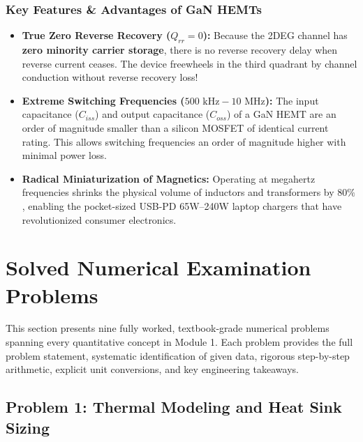 \documentclass[11pt,a4paper]{article}
\begin{document}
\subsubsection{Key Features \& Advantages of GaN HEMTs}
\begin{itemize}[leftmargin=*]
  \item \textbf{True Zero Reverse Recovery ($Q_{rr} = 0$):} Because the 2DEG channel has \textbf{zero minority carrier storage}, there is no reverse recovery delay when reverse current ceases. The device freewheels in the third quadrant by channel conduction without reverse recovery loss!
  \item \textbf{Extreme Switching Frequencies ($500\text{ kHz} - 10\text{ MHz}$):} The input capacitance ($C_{iss}$) and output capacitance ($C_{oss}$) of a GaN HEMT are an order of magnitude smaller than a silicon MOSFET of identical current rating. This allows switching frequencies an order of magnitude higher with minimal power loss.
  \item \textbf{Radical Miniaturization of Magnetics:} Operating at megahertz frequencies shrinks the physical volume of inductors and transformers by $80\%$, enabling the pocket-sized USB-PD 65W–240W laptop chargers that have revolutionized consumer electronics.
\end{itemize}

\section{Solved Numerical Examination Problems}

This section presents nine fully worked, textbook-grade numerical problems spanning every quantitative concept in Module 1. Each problem provides the full problem statement, systematic identification of given data, rigorous step-by-step arithmetic, explicit unit conversions, and key engineering takeaways.

\subsection{Problem 1: Thermal Modeling and Heat Sink Sizing}
\end{document}
